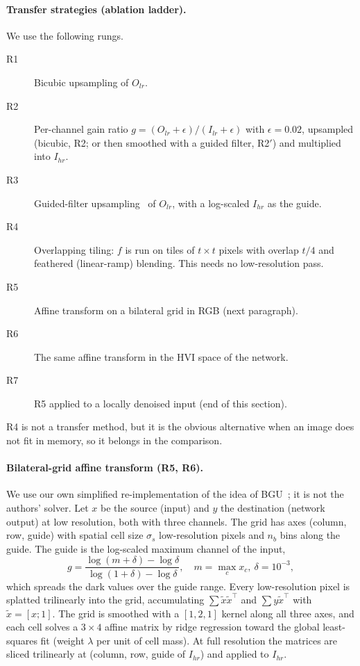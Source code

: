 \documentclass[runningheads]{llncs}
\begin{document}
\paragraph{Transfer strategies (ablation ladder).} We use the following rungs.
\begin{description}
\item[R1] Bicubic upsampling of $O_{lr}$.
\item[R2] Per-channel gain ratio $g=(O_{lr}+\epsilon)/(I_{lr}+\epsilon)$ with $\epsilon=0.02$, upsampled (bicubic, R2; or then smoothed with a guided filter, R2$'$) and multiplied into $I_{hr}$.
\item[R3] Guided-filter upsampling~\cite{guided} of $O_{lr}$, with a log-scaled $I_{hr}$ as the guide.
\item[R4] Overlapping tiling: $f$ is run on tiles of $t{\times}t$ pixels with overlap $t/4$ and feathered (linear-ramp) blending. This needs no low-resolution pass.
\item[R5] Affine transform on a bilateral grid in RGB (next paragraph).
\item[R6] The same affine transform in the HVI space of the network.
\item[R7] R5 applied to a locally denoised input (end of this section).
\end{description}
R4 is not a transfer method, but it is the obvious alternative when an image does not fit in memory, so it belongs in the comparison.

\paragraph{Bilateral-grid affine transform (R5, R6).} We use our own simplified re-implementation of the idea of BGU~\cite{bgu}; it is not the authors' solver. Let $x$ be the source (input) and $y$ the destination (network output) at low resolution, both with three channels. The grid has axes (column, row, guide) with spatial cell size $\sigma_s$ low-resolution pixels and $n_b$ bins along the guide. The guide is the log-scaled maximum channel of the input,
\begin{equation}
g=\frac{\log(m+\delta)-\log\delta}{\log(1+\delta)-\log\delta},\quad m=\max_c x_c,\ \delta=10^{-3},
\end{equation}
which spreads the dark values over the guide range. Every low-resolution pixel is splatted trilinearly into the grid, accumulating $\sum \tilde x\tilde x^\top$ and $\sum y\tilde x^\top$ with $\tilde x=[x;1]$. The grid is smoothed with a $[1,2,1]$ kernel along all three axes, and each cell solves a $3{\times}4$ affine matrix by ridge regression toward the global least-squares fit (weight $\lambda$ per unit of cell mass). At full resolution the matrices are sliced trilinearly at (column, row, guide of $I_{hr}$) and applied to $I_{hr}$.
\end{document}
